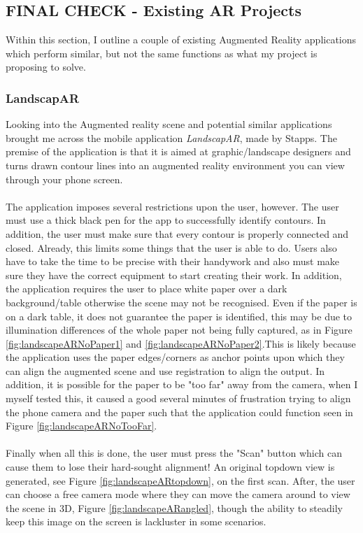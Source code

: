 \documentclass[11pt]{article}
\begin{document}
\subsection{FINAL CHECK - Existing AR Projects}
Within this section, I outline a couple of existing Augmented Reality 
applications which perform similar, but not the same functions as 
what my project is proposing to solve.

\subsubsection{LandscapAR}
\label{LandscapAR}
Looking into the Augmented reality scene and potential similar
applications brought me across the mobile application \textit{LandscapAR},
made by Stapps. The premise of the application is that it is aimed at
graphic/landscape designers and turns drawn contour lines into an augmented
reality environment you can view through your phone screen. \\
\\
The application imposes several restrictions upon the user, however. The user
must use a thick black pen for the app to successfully identify contours. 
In addition, the user must make sure that every contour is properly connected
and closed. Already, this limits some things that the user is able to do.
Users also have to take the time to be precise with their handywork and also 
must make sure they have the 
correct equipment to start creating their work. In addition, the application
requires the user to place white paper over a dark background/table otherwise
the scene may not be recognised. Even if the paper is on a dark table, it 
does not guarantee the paper is identified, this may be due to illumination
differences of the whole paper not being fully captured, as in 
Figure \ref{fig:landscapeARNoPaper1} and \ref{fig:landscapeARNoPaper2}.This 
is likely because the application uses 
the paper edges/corners as anchor points upon which they can align the 
augmented scene and use registration to align the output. In addition, it
is possible for the paper to be "too far" away from the camera, when I
myself tested this, it caused a good several minutes of frustration trying
to align the phone camera and the paper such that the application could 
function seen in Figure \ref{fig:landscapeARNoTooFar}.\\
\\ 
Finally when all this is done, the user must press the "Scan" button
which can cause them to lose their hard-sought alignment! An original
topdown view is generated, see Figure \ref{fig:landscapeARtopdown}, on
the first scan. After, the user can choose a free camera mode where they 
can move the camera around to view the scene in 3D, 
Figure \ref{fig:landscapeARangled}, though the ability to steadily
keep this image on the screen is lackluster in some scenarios.  \\
\end{document}
